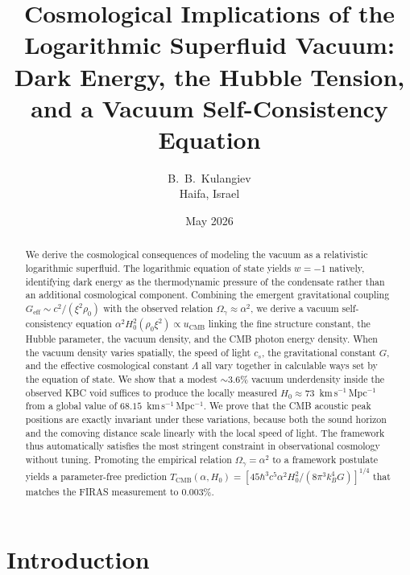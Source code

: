\documentclass[12pt, a4paper]{article}
\newcommand{\Geff}{G_{\mathrm{eff}}}
\newcommand{\Tcmb}{T_{\mathrm{CMB}}}
\begin{document}
\title{Cosmological Implications of the Logarithmic Superfluid Vacuum:\\
Dark Energy, the Hubble Tension, and a Vacuum Self-Consistency Equation}

\author{B.~B.~Kulangiev\\\small{Haifa, Israel}}
\date{May 2026}
\maketitle

\begin{abstract}
\noindent
We derive the cosmological consequences of modeling the vacuum as a relativistic logarithmic superfluid. The logarithmic equation of state yields $w = -1$ natively, identifying dark energy as the thermodynamic pressure of the condensate rather than an additional cosmological component. Combining the emergent gravitational coupling $\Geff \sim c^2/(\xi^2\rho_0)$ with the observed relation $\Omega_\gamma \approx \alpha^2$, we derive a vacuum self-consistency equation $\alpha^2 H_0^2 (\rho_0\xi^2) \propto u_{\mathrm{CMB}}$ linking the fine structure constant, the Hubble parameter, the vacuum density, and the CMB photon energy density. When the vacuum density varies spatially, the speed of light $c_s$, the gravitational constant $G$, and the effective cosmological constant $\Lambda$ all vary together in calculable ways set by the equation of state. We show that a modest $\sim 3.6\%$ vacuum underdensity inside the observed KBC void suffices to produce the locally measured $H_0 \approx 73$~km\,s$^{-1}$\,Mpc$^{-1}$ from a global value of $68.15$~km\,s$^{-1}$\,Mpc$^{-1}$. We prove that the CMB acoustic peak positions are exactly invariant under these variations, because both the sound horizon and the comoving distance scale linearly with the local speed of light. The framework thus automatically satisfies the most stringent constraint in observational cosmology without tuning. Promoting the empirical relation $\Omega_\gamma = \alpha^2$ to a framework postulate yields a parameter-free prediction $\Tcmb(\alpha, H_0) = [45\hbar^3 c^5\alpha^2 H_0^2/(8\pi^3 k_B^4 G)]^{1/4}$ that matches the FIRAS measurement to $0.003\%$.
\end{abstract}


\section{Introduction}
\label{sec:intro}
\end{document}
